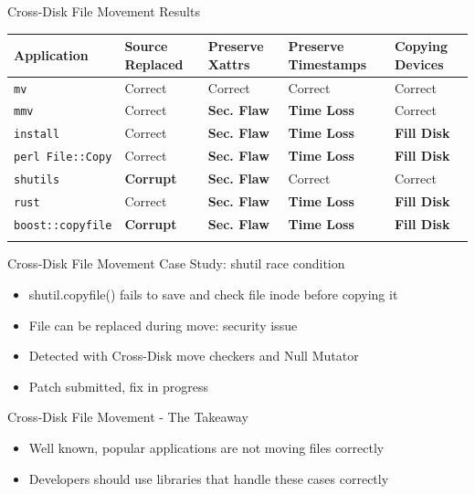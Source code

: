 \documentclass[pdf]{beamer}
\begin{document}
\begin{frame}{Cross-Disk File Movement Results}
 \begin{table}[t]
    \scriptsize{}
    \begin{tabular}{l p{1cm} p{1cm} p{1.2cm} p{1cm}}
    \toprule{}
        Application     & Source Replaced & Preserve Xattrs & Preserve Timestamps & Copying Devices\\
\hline
        {\tt mv}              & Correct             & Correct         & Correct             & Correct\\
        {\tt mmv}             & Correct             & {\bf Sec. Flaw} & {\bf Time Loss} & Correct\\
        {\tt install}         & Correct             & {\bf Sec. Flaw} & {\bf Time Loss} & {\bf Fill Disk} \\
        {\tt perl File::Copy} & Correct             & {\bf Sec. Flaw} & {\bf Time Loss} & {\bf Fill Disk} \\
        {\tt shutils}         & {\bf Corrupt}	& {\bf Sec. Flaw} 	& Correct             & Correct\\
        {\tt rust}             & Correct             & {\bf Sec. Flaw} & {\bf Time Loss} & {\bf Fill Disk} \\
        {\tt boost::copyfile} & {\bf Corrupt}	      & {\bf Sec. Flaw} & {\bf Time Loss} & {\bf Fill Disk} \\
    \bottomrule{}
    \end{tabular}
\end{table}
\end{frame}


\begin{frame}{Cross-Disk File Movement Case Study: shutil race condition}
  \begin{itemize}
    \item{shutil.copyfile() fails to save and check file inode before
      copying it}
    \item{File can be replaced during move: security issue}
    \item{Detected with Cross-Disk move checkers and Null Mutator}
    \item{Patch submitted, fix in progress}
  \end{itemize}
\end{frame}


\begin{frame}{Cross-Disk File Movement - The Takeaway}
  \begin{itemize}
    \item{Well known, popular applications are not moving files correctly}
    \item{Developers should use libraries that handle these cases
        correctly}
  \end{itemize}
\end{frame}
\end{document}
